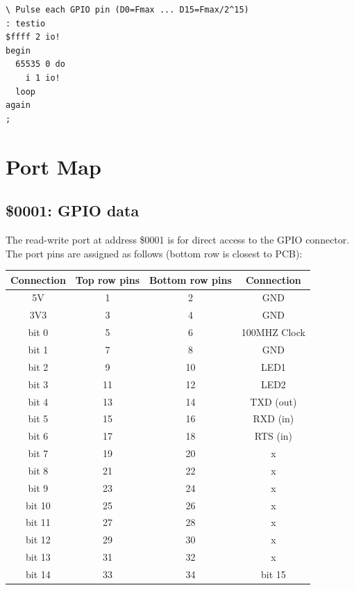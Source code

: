\begin{framed}
\begin{Verbatim}
\ Pulse each GPIO pin (D0=Fmax ... D15=Fmax/2^15)
: testio
$ffff 2 io!
begin
  65535 0 do
    i 1 io!
  loop
again
;
\end{Verbatim}
\end{framed}



\newpage
\section{Port Map}
\subsection{\$0001: GPIO data}

The read-write port at address \$0001 is for direct access to the GPIO
connector. The port pins are assigned as follows (bottom row is closest to PCB):

\vspace{10pt}
\begin{tabular}{cccc}
\textbf{Connection} & \textbf{Top row pins} & \textbf{Bottom row pins} & \textbf{Connection} \\
\hline
5V  &  1 &   2 & GND \\
3V3 &  3 &   4 & GND \\
bit 0 &  5 &   6 & 100MHZ Clock \\
bit 1 &  7 &   8 & GND \\
bit 2 & 9  &  10 & LED1 \\
bit 3 & 11 & 12 & LED2 \\
bit 4 & 13 & 14 & TXD (out) \\
bit 5 & 15 & 16 & RXD (in) \\
bit 6 & 17 & 18 & RTS (in) \\
bit 7 & 19 & 20 & x \\
bit 8 & 21 & 22 & x \\
bit 9 & 23 & 24 & x \\
bit 10 & 25 & 26 & x \\
bit 11 & 27 & 28 & x \\
bit 12 & 29 & 30 & x \\
bit 13 & 31 & 32 & x \\
bit 14 & 33 & 34 & bit 15 \\



\end{tabular}
\vspace{10pt}


